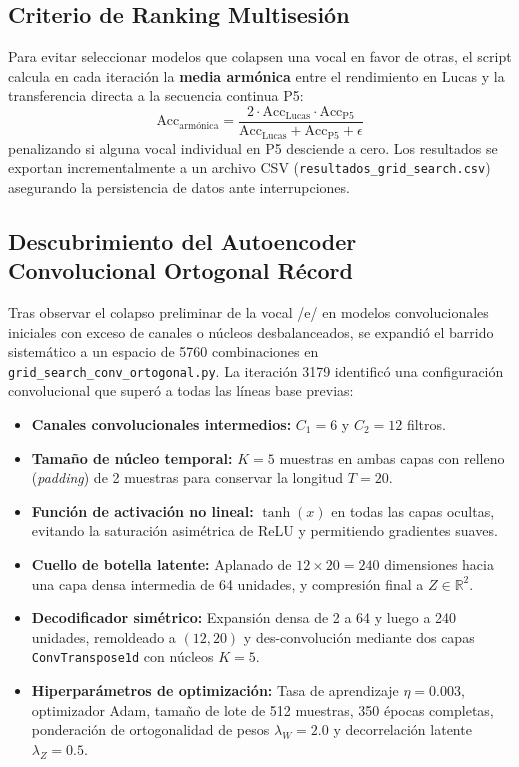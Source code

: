 \documentclass[11pt,a4paper,openany]{book}
\theoremstyle{definition}
\begin{document}
\subsection{Criterio de Ranking Multisesión}
\label{subsec:criterio_ranking}

Para evitar seleccionar modelos que colapsen una vocal en favor de otras, el script calcula en cada iteración la \textbf{media armónica} entre el rendimiento en Lucas y la transferencia directa a la secuencia continua P5:
\begin{equation}
    \text{Acc}_{\text{armónica}} = \frac{2 \cdot \text{Acc}_{\text{Lucas}} \cdot \text{Acc}_{\text{P5}}}{\text{Acc}_{\text{Lucas}} + \text{Acc}_{\text{P5}} + \epsilon}
\end{equation}
penalizando si alguna vocal individual en P5 desciende a cero. Los resultados se exportan incrementalmente a un archivo CSV (\texttt{resultados\_grid\_search.csv}) asegurando la persistencia de datos ante interrupciones.

\subsection{Descubrimiento del Autoencoder Convolucional Ortogonal Récord}
\label{subsec:conv_ortogonal_record}

Tras observar el colapso preliminar de la vocal /e/ en modelos convolucionales iniciales con exceso de canales o núcleos desbalanceados, se expandió el barrido sistemático a un espacio de 5760 combinaciones en \texttt{grid\_search\_conv\_ortogonal.py}. La iteración 3179 identificó una configuración convolucional que superó a todas las líneas base previas:

\begin{itemize}
    \item \textbf{Canales convolucionales intermedios:} $C_1 = 6$ y $C_2 = 12$ filtros.
    \item \textbf{Tamaño de núcleo temporal:} $K = 5$ muestras en ambas capas con relleno (\textit{padding}) de 2 muestras para conservar la longitud $T = 20$.
    \item \textbf{Función de activación no lineal:} $\tanh(x)$ en todas las capas ocultas, evitando la saturación asimétrica de ReLU y permitiendo gradientes suaves.
    \item \textbf{Cuello de botella latente:} Aplanado de $12 \times 20 = 240$ dimensiones hacia una capa densa intermedia de 64 unidades, y compresión final a $Z \in \mathbb{R}^2$.
    \item \textbf{Decodificador simétrico:} Expansión densa de 2 a 64 y luego a 240 unidades, remoldeado a $(12, 20)$ y des-convolución mediante dos capas \texttt{ConvTranspose1d} con núcleos $K = 5$.
    \item \textbf{Hiperparámetros de optimización:} Tasa de aprendizaje $\eta = 0.003$, optimizador Adam, tamaño de lote de 512 muestras, 350 épocas completas, ponderación de ortogonalidad de pesos $\lambda_W = 2.0$ y decorrelación latente $\lambda_Z = 0.5$.
\end{itemize}
\end{document}
